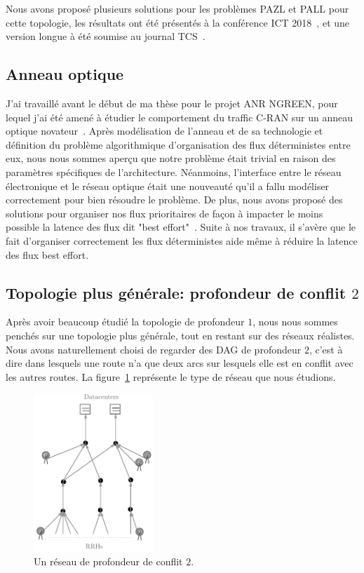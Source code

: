 \documentclass{article}
\begin{document}
  Nous avons proposé plusieurs solutions pour les problèmes PAZL et PALL pour cette topologie, les résultats ont été présentés à la conférence ICT 2018~\cite{DBLP:conf/ict/BarthGLMS18}, et une version longue à été soumise au journal TCS~\cite{DBLP:journals/corr/abs-1902-03018}.
  \subsection{Anneau optique}
  J'ai travaillé avant le début de ma thèse pour le projet ANR NGREEN, pour lequel j'ai été amené à étudier le comportement du traffic C-RAN sur un anneau optique novateur~\cite{ngreenarchitecture,uscumlic2018scalable}.
  Après modélisation de l'anneau et de sa technologie et définition du problème algorithmique d'organisation des flux déterministes entre eux, nous nous sommes aperçu que notre problème était trivial en raison des paramètres spécifiques de l'architecture. Néanmoins, l'interface entre le réseau électronique et le réseau optique était une nouveauté qu'il a fallu modéliser correctement pour bien résoudre le problème. De plus, nous avons proposé des solutions pour organiser nos flux prioritaires de façon à impacter le moins possible la latence des flux dit "best effort"~\cite{DBLP:journals/corr/abs-1902-03018}. Suite à nos travaux, il s'avère que le fait d'organiser correctement les flux déterministes aide même à réduire la latence des flux best effort.

   \subsection{Topologie plus générale: profondeur de conflit $2$}
 
 Après avoir beaucoup étudié la topologie de profondeur $1$, nous nous sommes penchés sur une topologie plus générale, tout en restant sur des réseaux réalistes. Nous avons naturellement choisi de regarder des DAG de profondeur $2$, c'est à dire dans lesquels une route n'a que deux arcs sur lesquels elle est en conflit avec les autres routes.
 La figure~\ref{fig:extendendgraphgrey} représente le type de réseau que nous étudions. 

\begin{figure}[h]
\begin{center}
 \includegraphics[width=0.4\textwidth]{extendendgraphgrey}
\caption{Un réseau de profondeur de conflit $2$.}\label{fig:extendendgraphgrey}
\end{center}
\end{figure}
\end{document}
